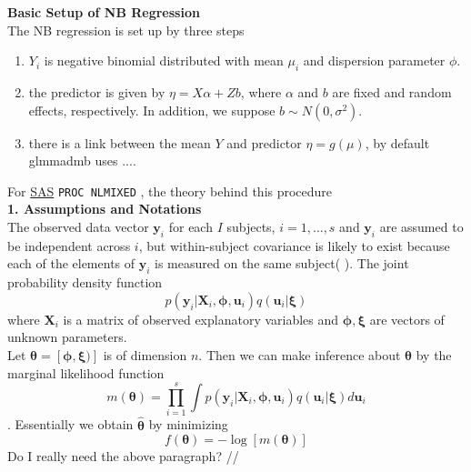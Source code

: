 \documentclass[paper=a4, fontsize=12.5pt]{scrartcl} %
\numberwithin{equation}{section} %
\numberwithin{figure}{section} %
\numberwithin{table}{section} %
\begin{document}
\textbf{ Basic Setup of NB Regression}\\
The NB regression is set up by three steps
\begin{enumerate}
  \item $Y_i$ is negative binomial distributed with mean $\mu_i$ and dispersion parameter $\phi$.
  \item the predictor is given by $\eta = X\alpha + Zb$, where $\alpha$ and $b$ are fixed and random effects, respectively. In addition, we suppose $b\sim N(0, \sigma^2)$.
  \item there is a link between the mean $Y$ and predictor $\eta = g(\mu)$, by default glmmadmb uses ....
\end{enumerate}

For  \href{http://support.sas.com/documentation/cdl/en/statug/63033/HTML/default
/viewer.htm#statug_nlmixed_sect022.htm}{SAS} \verb"PROC NLMIXED" , the theory behind this procedure \\
\textbf{1. Assumptions and Notations}\\
  The observed data vector $\bm y_i$ for each $I$ subjects, $i=1, \ldots, s$ and $\bm y_i$ are assumed to be independent across $i$, but within-subject covariance is likely to exist because each of the elements of $\bm y_i$ is measured on the same subject( {\color{blue}{that implies it can deal with repeated measurement}}). The joint probability density function 
  \[p(\bm y_i|\bm X_i, \bm \phi, \bm u_i)q(\bm u_i|\bm \xi)\]
  where $\bm X_i$ is a matrix of observed explanatory variables and $\bm \phi, \bm \xi$ are vectors of unknown parameters.\\
  Let $\bm \theta =[\bm \phi, \bm \xi)]$ is of dimension $n$. Then we can make inference about $\bm\theta$ by the marginal likelihood function
  \[m(\bm \theta)= \prod_{i=1}^s\int p(\bm y_i|\bm X_i, \bm \phi, \bm u_i)q(\bm u_i|\bm \xi)d\bm u_i\]. Essentially we obtain $\hat{\bm \theta}$ by minimizing 
  $$f(\bm \theta)= -\log [m(\bm \theta)]$$
  {\color{green} Do I really need the above paragraph?} //
  
\end{document}
